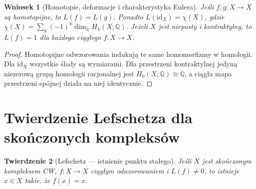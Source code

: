 \documentclass[11pt,a4paper,oneside]{report}
\newcommand{\Q}{\mathbb{Q}}
\newcommand{\id}{\mathrm{id}}
\theoremstyle{plain}
\newtheorem{twierdzenie}{Twierdzenie}[section]
\newtheorem{wniosek}[twierdzenie]{Wniosek}
\theoremstyle{definition}
\theoremstyle{remark}
\begin{document}
\begin{wniosek}[Homotopie, deformacje i charakterystyka Eulera]
Jeśli $f,g:X\to X$ są homotopijne, to $L(f)=L(g)$.
Ponadto $L(\id_X)=\chi(X)$, gdzie
$\chi(X)=\sum_k(-1)^k\dim_\Q H_k(X;\Q)$.
Jeżeli $X$ jest niepusty i kontraktylny, to $L(f)=1$
dla każdego ciągłego $f:X\to X$.
\end{wniosek}
\begin{proof}
Homotopijne odwzorowania indukują te same homomorfizmy
w homologii. Dla $\id_X$ wszystkie ślady są wymiarami.
Dla przestrzeni kontraktylnej jedyną niezerową grupą
homologii racjonalnej jest $H_0(X;\Q)\cong\Q$,
a ciągła mapa przestrzeni spójnej działa na niej identycznie.
\end{proof}

\section{Twierdzenie Lefschetza dla skończonych kompleksów}
\begin{twierdzenie}[Lefschetz — istnienie punktu stałego]
\label{thm:lefschetz-v10}
Jeśli $X$ jest skończonym kompleksem CW, $f:X\to X$
ciągłym odwzorowaniem i $L(f)\ne0$, to istnieje
$x\in X$ takie, że $f(x)=x$.
\end{twierdzenie}
\end{document}
